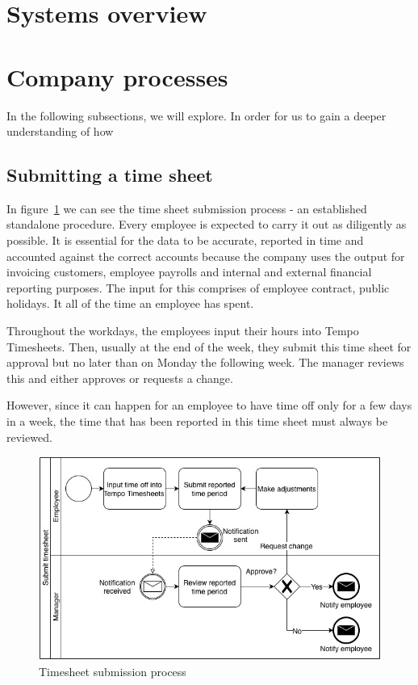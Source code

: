 \documentclass[12pt,oneside]{fithesis2}
\begin{document}
\section{Systems overview}
\section{Company processes}
In the following subsections, we will explore. In order for us to gain a deeper understanding of how

\subsection{Submitting a time sheet}
In figure~\ref{fig:submit_timesheet} we can see the time sheet submission process - an established standalone procedure. Every employee is expected to carry it out as diligently as possible. It is essential for the data to be accurate, reported in time and accounted against the correct accounts because the company uses the output for invoicing customers, employee payrolls and internal and external financial reporting purposes. The input for this comprises of employee contract, public holidays. It all of the time an employee has spent.

Throughout the workdays, the employees input their hours into Tempo Timesheets. Then, usually at the end of the week, they submit this time sheet for approval but no later than on Monday the following week. The manager reviews this and either approves or requests a change.

However, since it can happen for an employee to have time off only for a few days in a week, the time that has been reported in this time sheet must always be reviewed.

\begin{figure}[H]
    \centering
    \includegraphics[width=\textwidth]{images/submit_timesheet.jpg}
    \caption{Timesheet submission process}
    \label{fig:submit_timesheet}
\end{figure}
\end{document}
